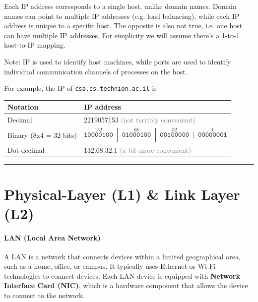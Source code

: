 \documentclass[openany,12pt]{book}
\begin{document}
Each IP address corresponds to a single host, unlike domain names. Domain names can point to multiple IP addresses (e.g. load balancing), while each IP address is unique to a specific host. The opposite is also not true, i.e. one host can have multiple IP addresses. For simplicity we will assume there's a 1-to-1 host-to-IP mapping.

Note: IP is used to identify host machines, while ports are used to identify individual communication channels of processes on the host.



\vspace{0.5em} %
\begin{center}
  For example, the IP of \texttt{csa.cs.technion.ac.il} is
  \begin{tabular}{ll}
    \toprule
    \textbf{Notation}      & \textbf{IP address}                                                              \\
    \midrule
    Decimal                & 2219057153 \textcolor{gray}{(not terribly convenient)}                           \\[1.5ex]
    Binary (8x4 = 32 bits) &
    $\overset{132}{\texttt{10000100}} \enspace | \enspace
      \overset{68}{\texttt{01000100}} \enspace | \enspace
      \overset{32}{\texttt{00100000}} \enspace | \enspace
    \overset{1}{\texttt{00000001}}$                                                                           \\[1.5ex]
    Dot-decimal            & \textcolor{blue!80!black}{132.68.32.1} \textcolor{gray}{(a bit more convenient)} \\
    \bottomrule
  \end{tabular}
\end{center}



\noindent\rule{\linewidth}{0.5pt}


\section*{Physical-Layer (L1) \& Link Layer (L2)}

\paragraph{LAN (Local Area Network)} A LAN is a network that connects devices within a limited geographical area, such as a home, office, or campus. It typically uses Ethernet or Wi-Fi technologies to connect devices. Each LAN device is equipped with \textbf{Network Interface Card (NIC)}, which is a hardware component that allows the device to connect to the network. 
\end{document}
